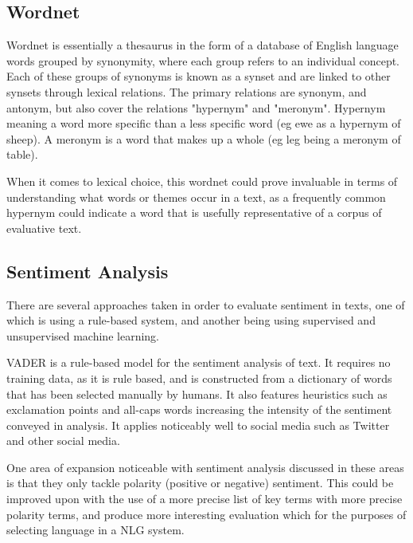 \subsection{Wordnet}

Wordnet is essentially a thesaurus in the form of a database of English language words grouped by synonymity, where each group refers to an individual concept. Each of these groups of synonyms is known as a synset and are linked to other synsets through lexical relations.
The primary relations are synonym, and antonym, but also cover the relations "hypernym" and "meronym". Hypernym meaning a word more specific than a less specific word (eg ewe as a hypernym of sheep). A meronym is a word that makes up a whole (eg leg being a meronym of table). 

When it comes to lexical choice, this wordnet could prove invaluable in terms of understanding what words or themes occur in a text, as a frequently common hypernym could indicate a word that is usefully representative of a corpus of evaluative text.


\subsection{Sentiment Analysis}
There are several approaches taken in order to evaluate sentiment in texts, one of which is using a rule-based system, and another being using supervised and unsupervised machine learning.

VADER is a rule-based model for the sentiment analysis of text. It requires no training data, as it is rule based, and is constructed from a dictionary of words that has been selected manually by humans. It also features heuristics such as exclamation points and all-caps words increasing the intensity of the sentiment conveyed in analysis. It applies noticeably well to social media such as Twitter and other social media.

One area of expansion noticeable with sentiment analysis discussed in these areas is that they only tackle polarity (positive or negative) sentiment. This could be improved upon with the use of a more precise list of key terms with more precise polarity terms, and produce more interesting evaluation which for the purposes of selecting language in a NLG system.



